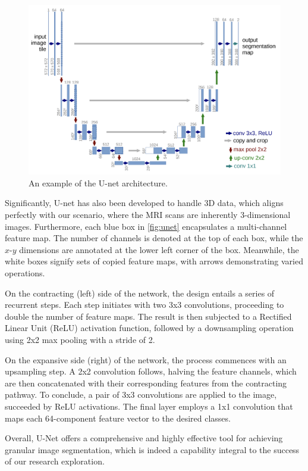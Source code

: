 \begin{figure}[htp]
    \centering
    \includegraphics[width=\textwidth]{./figures/unet.png}
    \caption{An example of the U-net architecture.}
    \label{fig:unet}
\end{figure}

Significantly, U-net has also been developed to handle 3D data, which aligns perfectly with our scenario, where the MRI scans are inherently 3-dimensional images. Furthermore, each blue box in \autoref{fig:unet} encapsulates a multi-channel feature map. The number of channels is denoted at the top of each box, while the \(x\)-\(y\) dimensions are annotated at the lower left corner of the box. Meanwhile, the white boxes signify sets of copied feature maps, with arrows demonstrating varied operations.

On the contracting (left) side of the network, the design entails a series of recurrent steps. Each step initiates with two 3x3 convolutions, proceeding to double the number of feature maps. The result is then subjected to a Rectified Linear Unit (ReLU) activation function, followed by a downsampling operation using 2x2 max pooling with a stride of 2.

On the expansive side (right) of the network, the process commences with an upsampling step. A 2x2 convolution follows, halving the feature channels, which are then concatenated with their corresponding features from the contracting pathway. To conclude, a pair of 3x3 convolutions are applied to the image, succeeded by ReLU activations. The final layer employs a 1x1 convolution that maps each 64-component feature vector to the desired classes.

Overall, U-Net offers a comprehensive and highly effective tool for achieving granular image segmentation, which is indeed a capability integral to the success of our research exploration.

